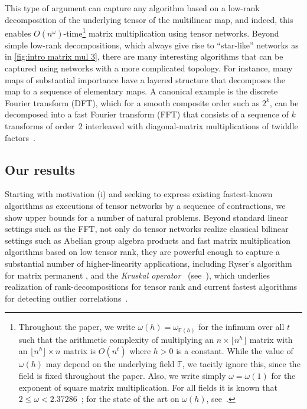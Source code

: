 \documentclass{toc}
\newcommand{\F}{\ensuremath{\mathbb{F}}}
\begin{document}
This type of argument can capture any algorithm based on a low-rank
decomposition of the underlying tensor of the multilinear map, and
indeed, this enables $O(n^\omega)$-time\footnote{Throughout the paper,
we write  
%
%
  $\omega(h) = \omega_{\F(h)}$    %
for the infimum over all $t$
such that the arithmetic complexity of multiplying an
$n \times \lfloor n^h\rfloor$ matrix with an $\lfloor n^h\rfloor\times n$
matrix is $O(n^t)$ where $h>0$ is a constant.
While the value of $\omega(h)$ may depend on the underlying
field $\F$, we tacitly ignore this, since the field is fixed throughout
the paper. Also, we write simply $\omega=\omega(1)$ for the exponent
of square matrix multiplication. For all fields it is known that
$2\leq\omega<2.37286$~\cite{AlmanVW2021,LeGall2014,VassilevskaWilliams2012};
for the state of the art on $\omega(h)$,
%
see~\cite{LeGallU2017}.}{} %
 matrix multiplication
using tensor networks.
Beyond simple low-rank decompositions, which always give rise to
``star-like'' networks as in \eqref{fig:intro matrix mul 3}, there are
many interesting algorithms that can be captured using networks with a
more complicated topology.
For instance, many maps of substantial
importance have a layered structure that decomposes the map to a sequence
of elementary maps. A canonical example is the
discrete Fourier transform (DFT),
which for a smooth composite order such as $2^k$, can be decomposed
into a fast Fourier transform (FFT) that consists of a sequence
of $k$ transforms of order~$2$ interleaved with diagonal-matrix
multiplications of twiddle factors~\cite{CooleyT1965,VanLoan1992}.

\subsection{Our results}
\label{sect:our}

Starting with motivation (i) and seeking to express existing fastest-known
algorithms
as executions of tensor networks by a sequence of contractions,
we show upper bounds for a number of
natural problems. Beyond standard linear settings such as the FFT,
not only do tensor networks realize classical bilinear settings
such as Abelian group algebra products and
fast matrix multiplication algorithms based on low tensor rank,
they are powerful enough to capture a substantial number of higher-linearity
applications, including Ryser's algorithm for matrix permanent \cite{Ryser1963},
and the \emph{Kruskal operator}~\cite{Kolda2006,Kruskal1977}
(see~), %
which underlies realization of rank-decompositions for tensor rank
\cite{Kolda2009} and current fastest algorithms for detecting outlier
correlations~\cite{KarppaKK2018}.
\end{document}
